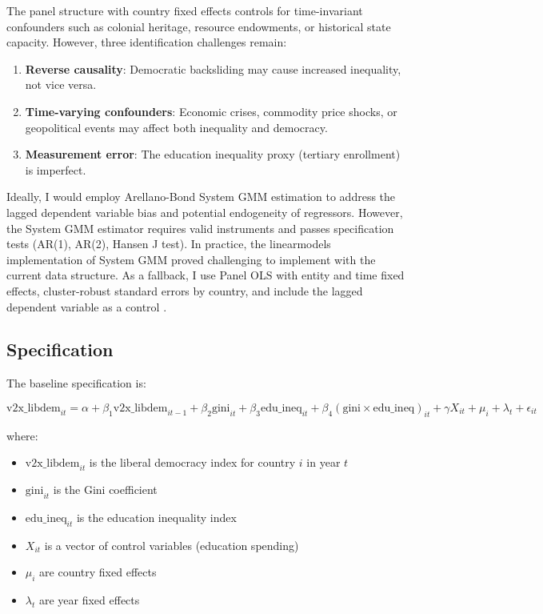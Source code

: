 \documentclass[11pt,letterpaper]{article}
\begin{document}
The panel structure with country fixed effects controls for time-invariant confounders such as colonial heritage, resource endowments, or historical state capacity. However, three identification challenges remain:

\begin{enumerate}
  \item \textbf{Reverse causality}: Democratic backsliding may cause increased inequality, not vice versa.
  \item \textbf{Time-varying confounders}: Economic crises, commodity price shocks, or geopolitical events may affect both inequality and democracy.
  \item \textbf{Measurement error}: The education inequality proxy (tertiary enrollment) is imperfect.
\end{enumerate}

Ideally, I would employ Arellano-Bond System GMM estimation \cite{Roodman2009} to address the lagged dependent variable bias and potential endogeneity of regressors. However, the System GMM estimator requires valid instruments and passes specification tests (AR(1), AR(2), Hansen J test). In practice, the linearmodels implementation of System GMM proved challenging to implement with the current data structure. As a fallback, I use Panel OLS with entity and time fixed effects, cluster-robust standard errors by country, and include the lagged dependent variable as a control \cite{Cameron2015}.

\subsection{Specification}

The baseline specification is:

\begin{equation}
\text{v2x\_libdem}_{it} = \alpha + \beta_1 \text{v2x\_libdem}_{it-1} + \beta_2 \text{gini}_{it} + \beta_3 \text{edu\_ineq}_{it} + \beta_4 (\text{gini} \times \text{edu\_ineq})_{it} + \gamma X_{it} + \mu_i + \lambda_t + \epsilon_{it}
\end{equation}

where:
\begin{itemize}
  \item $\text{v2x\_libdem}_{it}$ is the liberal democracy index for country $i$ in year $t$
  \item $\text{gini}_{it}$ is the Gini coefficient
  \item $\text{edu\_ineq}_{it}$ is the education inequality index
  \item $X_{it}$ is a vector of control variables (education spending)
  \item $\mu_i$ are country fixed effects
  \item $\lambda_t$ are year fixed effects
\end{itemize}
\end{document}
